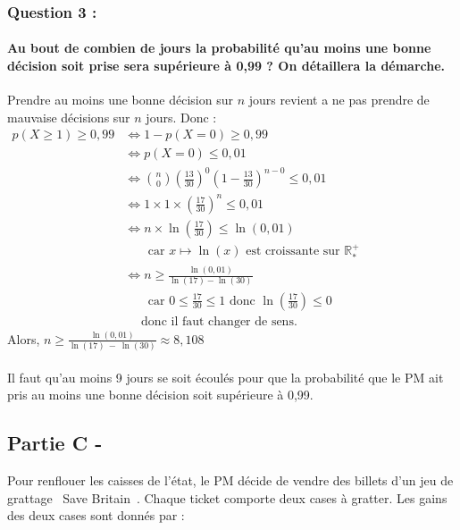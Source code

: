 \documentclass[a4paper, 12pt]{article}
\begin{document}
\subsubsection*{Question 3 :}
\paragraph*{Au bout de combien de jours la probabilité qu'au moins une bonne décision soit prise sera supérieure à 0,99 ? On détaillera la démarche.\\[5mm]}

Prendre au moins une bonne décision sur $n$ jours revient a ne pas prendre de mauvaise décisions sur $n$ jours. Donc : \\
$\begin{aligned}
p(X \geq 1) \geq 0,99 &\iff 1 - p(X = 0) \geq 0,99 \\
&\iff p(X = 0) \leq 0,01 \\
&\iff \binom{n}{0} \left( \frac{13}{30}\right)^0 \left(1 - \frac{13}{30}\right)^{n-0} \leq 0,01 \\
&\iff 1 \times 1 \times \left(\frac{17}{30} \right)^n \leq 0,01 \\
&\iff n \times \ln{\left( \frac{17}{30} \right) } \leq \ln{\left(0,01\right)} \\ 
&\phantom{\iff} \text{ car } x \mapsto \ln{\left(x\right)} \text{ est croissante sur } \mathds{R}^+_*\\
&\iff n  \geq \frac{\ln{\left(0,01\right)}}{\ln{\left(17\right)}-\ln{\left(30\right)}} \\
&\phantom{\iff} \text{ car } 0 \leq \frac{17}{30} \leq 1 \text{ donc } \ln{\left(\frac{17}{30}\right)} \leq 0 \\
& \phantom{\iff} \text{ donc il faut changer de sens.}
\end{aligned}$
\\[2mm]
Alors, $n \geq \frac{\ln{\left(0,01\right)}}{\ln{\left(17\right)}\ -\ \ln{\left(30\right)}} \approx 8,108 $
\\ \\
Il faut qu'au moins 9 jours se soit écoulés pour que la probabilité que le PM ait pris au moins une bonne décision soit supérieure à 0,99.

{}
\subsection*{Partie C -}
Pour renflouer les caisses de l'état, le PM décide de vendre des billets d'un jeu de grattage \guillemotleft\ Save Britain\ \guillemotright. Chaque ticket comporte deux cases à gratter. 
Les gains des deux cases sont donnés par : 
\\
\end{document}
